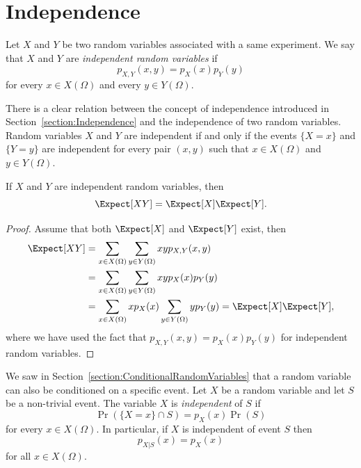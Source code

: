 \section{Independence}

Let $X$ and $Y$ be two random variables associated with a same experiment.
We say that $X$ and $Y$ are \emph{independent random variables} if 
\begin{equation*}
p_{X,Y} (x,y) = p_X (x) p_Y (y)
\end{equation*}
for every $x \in X(\Omega)$ and every $y \in Y(\Omega)$.

There is a clear relation between the concept of independence introduced in Section~\ref{section:Independence} and the independence of two random variables.
Random variables $X$ and $Y$ are independent if and only if the events $\{ X = x \}$ and $\{ Y = y \}$ are independent for every pair $(x, y)$ such that $x \in X(\Omega)$ and $y \in Y(\Omega)$.

\begin{proposition} \label{proposition:ExpectationProduct}
If $X$ and $Y$ are independent random variables, then
\begin{equation*}
\Expect [X Y] = \Expect [X] \Expect [Y] .
\end{equation*}
\end{proposition}
\begin{proof}
Assume that both $\Expect [X]$ and $\Expect[Y]$ exist, then
\begin{equation*}
\begin{split}
\Expect [XY]
&= \sum_{x \in X(\Omega)} \sum_{y \in Y(\Omega)} x y p_{X,Y} (x,y) \\
&= \sum_{x \in X(\Omega)} \sum_{y \in Y(\Omega)} x y p_X (x) p_Y (y) \\
&= \sum_{x \in X(\Omega)} x p_X (x) \sum_{y \in Y(\Omega)} y p_Y (y)
= \Expect [X] \Expect [Y] ,
\end{split}
\end{equation*}
where we have used the fact that $p_{X,Y} (x,y) = p_X (x) p_Y (y)$ for independent random variables.
\end{proof}

We saw in Section~\ref{section:ConditionalRandomVariables} that a random variable can also be conditioned on a specific event.
Let $X$ be a random variable and let $S$ be a non-trivial event.
The variable $X$ is \emph{independent} of $S$ if
\begin{equation*}
\Pr (\{X = x \} \cap S ) = p_X (x) \Pr (S)
\end{equation*}
for every $x \in X(\Omega)$.
In particular, if $X$ is independent of event $S$ then
\begin{equation*}
p_{X|S} (x) = p_X (x)
\end{equation*}
for all $x \in X(\Omega)$.

